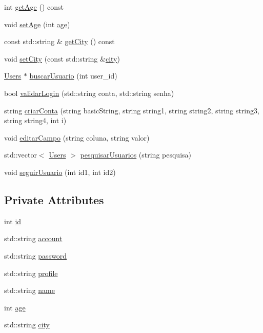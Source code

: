 \begin{DoxyCompactItemize}
int \hyperlink{class_users_a36956c95deb02797b556c6f04310cb27}{get\+Age} () const
\item 
void \hyperlink{class_users_a2e6c1406a9ccb2f23cd4691ff9162ab3}{set\+Age} (int \hyperlink{class_users_a7a1ab9517587c920030c67222c2e1973}{age})
\item 
const std\+::string \& \hyperlink{class_users_a7445786d7c4278d1d3438381fe666f85}{get\+City} () const
\item 
void \hyperlink{class_users_a4bcea5e8c632f33e503026e461790edc}{set\+City} (const std\+::string \&\hyperlink{class_users_ade0a0b1fbc7d0c7a2c131ab211d4b3f6}{city})
\item 
\hyperlink{class_users}{Users} $\ast$ \hyperlink{class_users_a6d3ffcb60c10377572f0b7f3ee7c2556}{buscar\+Usuario} (int user\+\_\+id)
\item 
bool \hyperlink{class_users_a5154215af21dcf9ec542b125f96f7000}{validar\+Login} (std\+::string conta, std\+::string senha)
\item 
string \hyperlink{class_users_a8f42faf201c994b2b1b61a22a99b8d14}{criar\+Conta} (string basic\+String, string string1, string string2, string string3, string string4, int i)
\item 
void \hyperlink{class_users_a90566edb592304aff048110306eb61f3}{editar\+Campo} (string coluna, string valor)
\item 
std\+::vector$<$ \hyperlink{class_users}{Users} $>$ \hyperlink{class_users_a8c59b2c1356db94c2d6ea891c922416f}{pesquisar\+Usuarios} (string pesquisa)
\item 
void \hyperlink{class_users_a0ae24caea62365afea1a7cccf7513cc1}{seguir\+Usuario} (int id1, int id2)
\end{DoxyCompactItemize}
\subsection*{Private Attributes}
\begin{DoxyCompactItemize}
\item 
int \hyperlink{class_users_a9227a9e924b546e37b745aa152d7ca23}{id}
\item 
std\+::string \hyperlink{class_users_a87b8bab72f85ca29b666142ae23dbc3c}{account}
\item 
std\+::string \hyperlink{class_users_a7f0ae4b423977cc0168c50e0b5be93e4}{password}
\item 
std\+::string \hyperlink{class_users_a133880ef122466073e9c97755c809ae9}{profile}
\item 
std\+::string \hyperlink{class_users_abfa55c64dfc5548eb796e163633404d2}{name}
\item 
int \hyperlink{class_users_a7a1ab9517587c920030c67222c2e1973}{age}
\item 
std\+::string \hyperlink{class_users_ade0a0b1fbc7d0c7a2c131ab211d4b3f6}{city}
\end{DoxyCompactItemize}
